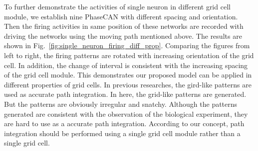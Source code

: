 \documentclass[final,5p,times,twocolumn,authoryear]{elsarticle}
\begin{document}
To further demonstrate the activities of single neuron in different grid cell module, we establish nine PhaseCAN with different spacing and orientation. Then the firing activities in same position of these networks are recorded with driving the networks using the moving path mentioned above. The results are shown in Fig.~\ref{fig:single_neuron_firing_diff_prop}. Comparing the figures from left to right, the firing patterns are rotated with increasing orientation of the grid cell. In addition, the change of interval is consistent with the increasing spacing of the grid cell module. This demonstrates our proposed model can be applied in different properties of grid cells. In previous researches\citep{Bush2015,Edvardsen2020}, the gird-like patterns are used as accurate path integration. In here, the grid-like patterns are generated. But the patterns are obviously irregular and snatchy. Although the patterns generated are consistent with the observation of the biological experiment\citep{Hafting2005}, they are hard to use as a accurate path integration. According to our concept, path integration should be performed using a single grid cell module rather than a single grid cell.
\end{document}
